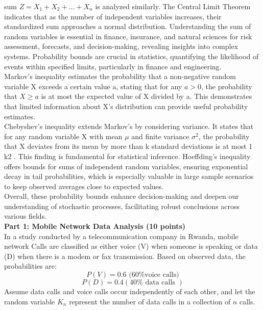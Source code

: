 \documentclass[a3paper,12pt]{extarticle} %
\begin{document}
    sum \(Z = X_1 + X_2 + . . . + X_n\) is analyzed similarly. The Central Limit Theorem indicates that as the
    number of independent variables increases, their standardized sum approaches a normal distribution.
    Understanding the sum of random variables is essential in finance, insurance, and natural sciences for
    risk assessment, forecasts, and decision-making, revealing insights into complex systems.
    Probability bounds are crucial in statistics, quantifying the likelihood of events within specified limits,
    particularly in finance and engineering.
    \\ Markov’s inequality estimates the probability that a non-negative random variable X exceeds a certain
    value a, stating that for any \(a > 0\), the probability that \(X \geq a\) is at most the expected value of X divided
    by a. This demonstrates that limited information about X’s distribution can provide useful probability
    estimates.
    \\ Chebyshev’s inequality extends Markov’s by considering variance. It states that for any random variable
    X with mean \(\mu\) and finite variance \(\sigma^2\), the probability that X deviates from its mean by more than k
    standard deviations is at most 1
    k2 . This finding is fundamental for statistical inference.
    Hoeffding’s inequality offers bounds for sums of independent random variables, ensuring exponential
    decay in tail probabilities, which is especially valuable in large sample scenarios to keep observed averages
    close to expected values.
    \\ Overall, these probability bounds enhance decision-making and deepen our understanding of stochastic
    processes, facilitating robust conclusions across various fields.
    \\ \subitem \textbf{Part 1: Mobile Network Data Analysis (10 points)}
    \\ In a study conducted by a telecommunication company in Rwanda, mobile network Calls are classified as either voice (V) when someone is speaking or data (D) when there is a modem or fax transmission. Based on observed data, the probabilities are:
    \[
    P(V) = 0.6 \text{ (60\% voice calls)}
    \]
    \[
    P(D) = 0.4 (40\% \text{ data calls })
    \]
    Assume data calls and voice calls occur independently of each other, and let the random variable \(K_n\) represent the number of data calls in a collection of \(n\) calls.
\end{document}
